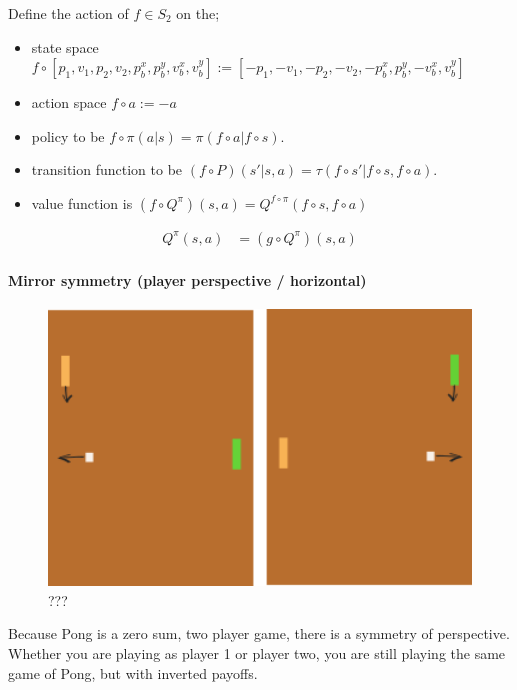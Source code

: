 Define the action of $f \in S_2$ on the;

\begin{itemize}
	\tightlist
	\item state space $f \circ [p_1, v_1, p_2, v_2, p^x_b, p^y_b, v^x_b, v^y_b] := [-p_1, -v_1, -p_2, -v_2, -p^x_b, p^y_b, -v^x_b, v^y_b]$
	\item action space $f \circ a := -a$
 	\item policy to be $f \circ \pi(a | s) = \pi(f \circ a | f \circ s)$.
	\item transition function to be $(f \circ P)(s' | s, a) = \tau(f \circ s'| f \circ s, f \circ a)$.
	\item value function is $(f \circ Q^{\pi})(s, a) = Q^{f \circ \pi}(f \circ s, f \circ a)$
\end{itemize}

\begin{align*}
Q^\pi(s, a) &= (g \circ Q^{\pi})(s, a) \tag{expected return}
\end{align*}


\paragraph{Mirror symmetry (player perspective / horizontal)}

\begin{figure}
\centering
\includegraphics[width=1\textwidth,height=0.25\textheight]{../../pictures/drawings/pong-horz-flip.png}
\caption{???}
\end{figure}

Because Pong is a zero sum, two player game, there is a symmetry of perspective.
Whether you are playing as player 1 or player two, you are still playing the same game of Pong,
but with inverted payoffs.

